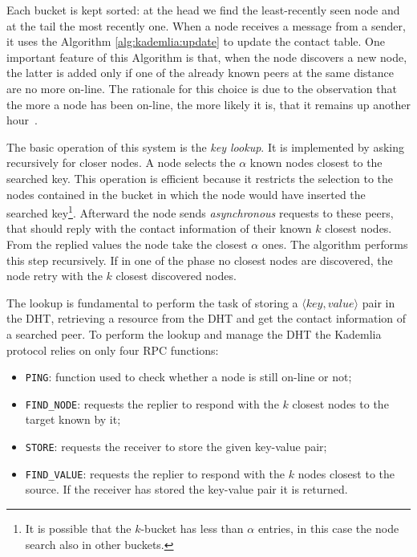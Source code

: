 Each bucket is kept sorted: at the head we find the least-recently seen node
and at the tail the most recently one.
When a node receives a message from a sender, it uses
the Algorithm \autoref{alg:kademlia:update} to update the contact table.
One important feature of this Algorithm is that, when the node discovers
a new node, the latter is added only if one of the already known peers at the
same distance are no more on-line. The rationale for this choice is due
to the observation that the more a node has been on-line, the more likely it is,
that it remains up another hour~\cite{bib:kademlia}.

The basic operation of this system is the \emph{key lookup}.
It is implemented by asking recursively for closer nodes.
A node selects the $\alpha$ known nodes
closest to the searched key. This operation is efficient because
it restricts the selection to the nodes contained in the bucket in which the
node would have inserted the searched key\footnote{It is possible that the 
	$k$-bucket
has less than $\alpha$ entries, in this case the node search also in other
buckets.}.
Afterward the node sends \emph{asynchronous} requests to these peers, that
should reply with the contact information of their known $k$ closest nodes.
From the replied values the node take the closest $\alpha$ ones.
The algorithm performs this step recursively.
If in one of the phase no closest nodes are discovered, the node retry with
the $k$ closest discovered nodes.

The lookup is fundamental to perform the task of storing a $\langle key,
value\rangle$ pair in the DHT, retrieving a resource from the DHT and get
the contact information of a searched peer.
To perform the lookup and manage the DHT the Kademlia protocol relies on only 
four RPC functions:
\begin{itemize}
	\item \verb|PING|: function used to check whether a node is still on-line
	or not;
	\item \verb|FIND_NODE|: requests the replier to respond with the $k$ closest
	nodes to the target known by it;
	\item \verb|STORE|: requests the receiver to store the given
	key-value pair;
	\item \verb|FIND_VALUE|: requests the replier to respond with the $k$
	nodes closest to the source. If the receiver has stored the key-value
	pair it is returned.
\end{itemize}


